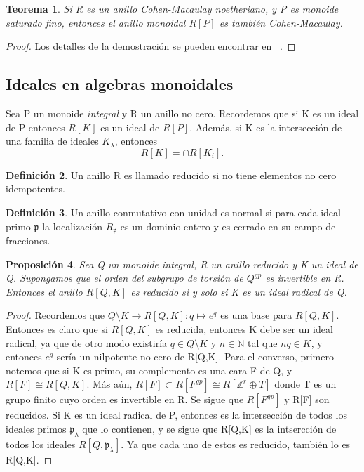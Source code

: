 \documentclass[12pt,spanish]{amsart}
\newcommand{\bb}[1]{\mathbb{#1}}
\newcommand{\fk}[1]{\mathfrak{#1}}
\newtheorem{Theorem}{Teorema}[section]
\newtheorem{prop}[Theorem]{Proposición}
\theoremstyle{definition}
\newtheorem{Def}[Theorem]{Definición}
\theoremstyle{remark}
\begin{document}
\begin{Theorem}
Si R es un anillo Cohen-Macaulay noetheriano, y P es monoide saturado fino, entonces el anillo monoidal $R[P]$ es también Cohen-Macaulay. 
\end{Theorem}

\begin{proof}
Los detalles de la demostración se pueden encontrar en ~\cite{hochster1972rings}.
\end{proof}








\subsection{Ideales en algebras monoidales}
Sea P un monoide \textit{integral} y R un anillo no cero. Recordemos que si K es un ideal de P entonces $R[K]$ es un ideal de $R[P]$. Además, si K es la intersección de una familia de ideales $K_{\lambda}$, entonces 
$$R[K] = \cap R[K_{i}].$$

\begin{Def}
Un anillo R es llamado reducido si no tiene elementos no cero idempotentes. 
\end{Def}

\begin{Def}
Un anillo conmutativo con unidad es normal si para cada ideal primo $\fk{p}$ la localización $R_{\fk{p}}$ es un dominio entero y es cerrado en su campo de fracciones. 
\end{Def}

\begin{prop}
Sea Q un monoide \textit{integral}, R un anillo reducido  y K un ideal de Q. Supongamos que el orden del subgrupo de torsión de $Q^{gp}$ es invertible en R. Entonces el anillo $R[Q,K]$ es reducido si y solo si K es un ideal radical de Q. 
\end{prop}

\begin{proof}
Recordemos que $Q\setminus K \to R[Q,K]:q \mapsto e^{q}$ es una base para $R[Q,K]$. Entonces es claro que si $R[Q,K]$ es reducida, entonces K debe ser un ideal radical, ya que de otro modo existiría $q\in Q\setminus K$ y $n\in \bb{N}$ tal que $nq\in K$, y entonces $e^{q}$ sería un nilpotente no cero de R[Q,K]. Para el converso, primero notemos que si K es primo, su complemento es una cara F de Q, y $R[F] \cong R[Q,K]$. Más aún, $R[F] \subset R[F^{gp}] \cong R[\bb{Z}^{r} \oplus T]$ donde T es un grupo finito cuyo orden es invertible en R. Se sigue que $R[F^{gp}]$ y R[F] son reducidos. Si K es un ideal radical de P, entonces es la intersección de todos los ideales primos $\fk{p}_{\lambda}$ que lo contienen, y se sigue que R[Q,K] es la intsercción de todos los ideales $R[Q,\fk{p}_{\lambda}]$. Ya que cada uno de estos es reducido, también lo es R[Q,K].   
\end{proof}
\end{document}
